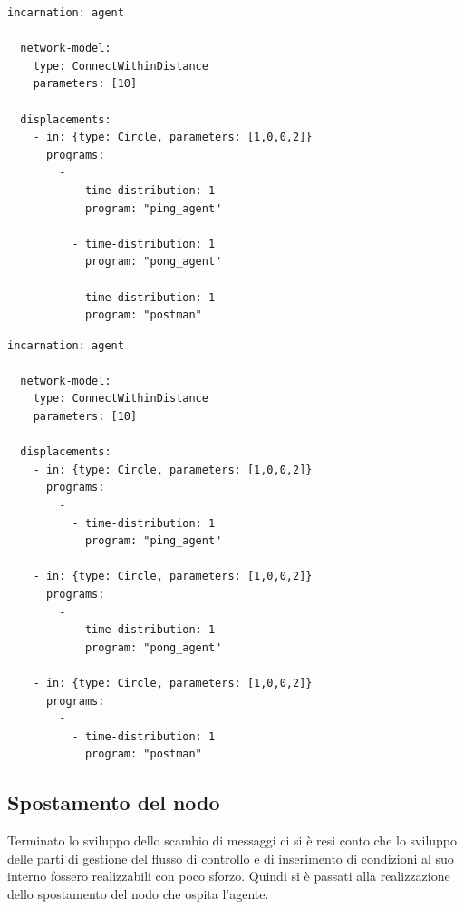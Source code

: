 \documentclass[12pt,a4paper,openright,twoside]{report}
\begin{document}
\medskip
\begin{lstlisting}[firstnumber=1,label={lst:SimulazioneStessoNodo},caption={Simulazione con agenti sullo stesso nodo}]
  incarnation: agent

  network-model:
    type: ConnectWithinDistance
    parameters: [10]

  displacements:
    - in: {type: Circle, parameters: [1,0,0,2]}
      programs:
        -
          - time-distribution: 1
            program: "ping_agent"

          - time-distribution: 1
            program: "pong_agent"

          - time-distribution: 1
            program: "postman"
\end{lstlisting}

\begin{lstlisting}[firstnumber=1,label={lst:SimulazioneNodiDiversi},caption={Simulazione con agenti su nodi diversi}]
  incarnation: agent

  network-model:
    type: ConnectWithinDistance
    parameters: [10]

  displacements:
    - in: {type: Circle, parameters: [1,0,0,2]}
      programs:
        -
          - time-distribution: 1
            program: "ping_agent"

    - in: {type: Circle, parameters: [1,0,0,2]}
      programs:
        -
          - time-distribution: 1
            program: "pong_agent"

    - in: {type: Circle, parameters: [1,0,0,2]}
      programs:
        -
          - time-distribution: 1
            program: "postman"
\end{lstlisting}


\subsection{Spostamento del nodo}
Terminato lo sviluppo dello scambio di messaggi ci si \`e resi conto che lo sviluppo delle parti di gestione del flusso di controllo e di inserimento di condizioni al suo interno fossero realizzabili con poco sforzo. Quindi si \`e passati alla  realizzazione dello spostamento del nodo che ospita l'agente.
\end{document}
